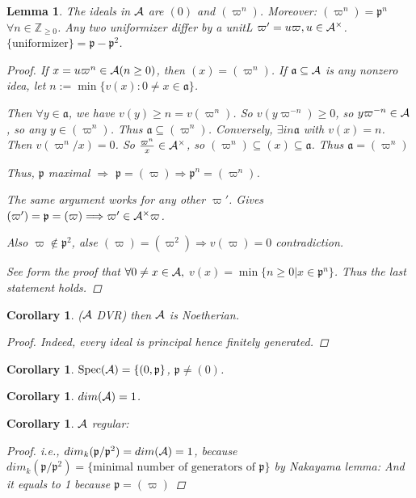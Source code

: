 \documentclass[11pt]{article}
\newtheorem{lemma}[thm]{Lemma}
\newtheorem{cor}[thm]{Corollary}
\newcommand{\intg}{\mathbb Z}
\newcommand{\sca}{{\mathfrak a}}
\newcommand{\scp}{{\mathfrak p}}
\newcommand{\cala}{{\cal A}}
\newcommand{\Lrta}{\Longrightarrow}
\begin{document}
\begin{lemma}
The ideals in $\cala$ are $(0)$ and $(\varpi^n)$. Moreover: $(\varpi^n)=\scp^n$ $\forall n\in \intg_{\geq 0}$. Any two uniformizer differ by a unitL $\varpi'=u\varpi,u\in \cala^\times$.
$\{\text{uniformizer}\}=\scp-\scp^2$.
\begin{proof}
If $x=u\varpi^n\in \cala (n\geq 0)$, then $(x)=(\varpi^n)$. If $\sca\subseteq \cala$ is any nonzero idea, let $n:=\min\{v(x):0\neq x\in \sca\}$.

Then $\forall y\in \sca$, we have $v(y)\geq n =v(\varpi^n)$. So $v(y\varpi^{-n})\geq 0$, so $y\varpi^{-n}\in\cala$, so any $y\in (\varpi^n)$. Thus $\sca\subseteq (\varpi^n)$. Conversely, $\exists in \sca$ with $v(x)=n$. Then $v(\varpi^n/x)=0$. So $\frac{\varpi^n}{x}\in \cala^\times$, so $(\varpi^n)\subseteq (x)\subseteq \sca$. Thus $\sca=(\varpi^n)$

Thus, $\scp$ maximal $\Lrta$ $\scp=(\varpi)\Lrta \scp^n=(\varpi^n)$.

The same argument works for any other $\varpi'$. Gives $(\varpi')=\scp=(\varpi)\Lrta \varpi'\in\cala^\times\varpi$.

Also $\varpi\notin\scp^2$, alse $(\varpi)=(\varpi^2)\Lrta v(\varpi)=0$ contradiction.

See form the proof that $\forall 0\neq x\in \cala,$
$v(x)=\min\{n\geq 0|x\in \scp^n\}$. Thus the last statement holds.
\end{proof}
\end{lemma}
\begin{cor}
($\cala$ DVR) then $\cala$ is Noetherian.
\begin{proof}
Indeed, every ideal is principal hence finitely generated.
\end{proof}
\end{cor}

\begin{cor}
$\text{Spec}(\cala)=\{(0,\scp\}$, $\scp\neq (0)$.
\end{cor}

\begin{cor}
$dim(\cala)=1$.
\end{cor}

\begin{cor}
$\cala$ regular:
\begin{proof}
i.e., $dim_k(\scp/\scp^2)=dim(\cala)=1$, because $dim_k(\scp/\scp^2)=\{\text{minimal number of generators of $\scp$}\}$ by Nakayama lemma:
And it equals to 1 because $\scp=(\varpi)$
\end{proof}
\end{cor}
\end{document}
